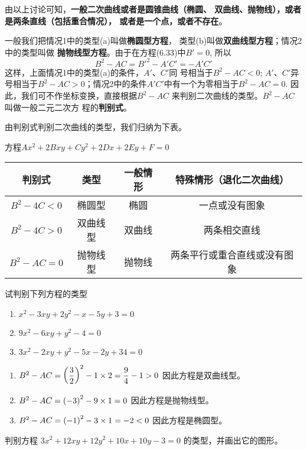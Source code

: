 由以上讨论可知，\textbf{一般二次曲线或者是圆锥曲线（椭圆、
双曲线、抛物线），或者是两条直线（包括重合情况），
或者是一个点，或者不存在}。

一般我们把情况1中的类型(a)叫做\textbf{椭圆型方程}，
类型(b)叫做\textbf{双曲线型方程}；情况2中的类型叫做
\textbf{抛物线型方程}。由于在方程(6.33)中$B'=0$, 所以
\[B^2-AC={B'}^2-A'C'=-A'C'\]
这样，上面情况1中的类型(a)的条件，$A'$、$C'$同
号相当于$B^2-AC<0$; $A'$、$C'$异号相当于$B^2-AC
>0$；情况2中的条件$A'C'$中有一个为零相当于$B^2-
AC=0$. 因此，我们可不作坐标变换，直接根据$B^2-AC$
来判别二次曲线的类型。$B^2-AC$叫做一般二元二次方
程的\textbf{判别式}。

由判别式判别二次曲线的类型，我们归纳为下表。
\begin{center}
    方程$Ax^2+2Bxy+Cy^2+2Dx+2Ey+F=0$
\begin{tabular}{cccc}
\hline
判别式&类型&一般情形&特殊情形（退化二次曲线）\\
\hline
$B^2-4C<0$ &椭圆型&椭圆&一点或没有图象\\
$B^2-4C>0$ &双曲线型&双曲线&两条相交直线\\
$B^2-AC=0$&抛物线型&抛物线&两条平行或重合直线或没有图象\\
\hline
\end{tabular}
\end{center}



\begin{example}
    试判别下列方程的类型
\begin{enumerate}
    \item $x^2-3xy+2y^2-x-5y+3=0$
    \item $9x^2-6xy+y^2-4=0$
    \item $3x^2-2xy+y^2-5x-2y+34=0$
\end{enumerate}
\end{example}

\begin{solution}
\begin{enumerate}
    \item $B^2-AC=\left(\dfrac{3}{2}\right)^2-1\times 2=\dfrac{9}{4}-1>0$
因此方程是双曲线型。
\item $B^2-AC=\left(-3\right)^2-9\times 1=0$
因此方程是抛物线型。
\item $B^2-AC=\left(-1\right)^2-3\times 1=-2<0$
因此方程是椭圆型。
\end{enumerate}    
\end{solution}

\begin{example}
    判别方程
$3x^2+12xy+12y^2+10x+10y-3=0$
的类型，并画出它的图形。
\end{example}

